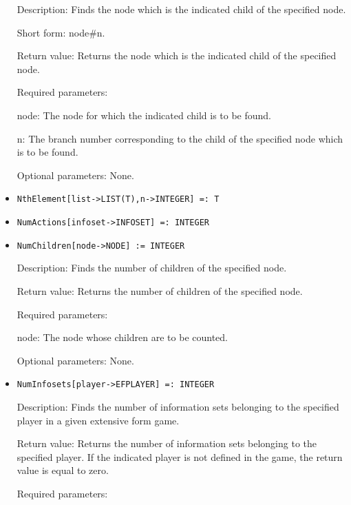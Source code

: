 \begin{itemize}
\bd
\item
[Description:] Finds the node which is the indicated child of the
specified node.  
\item
[Short form:] node\#n.
\item
[Return value:] Returns the node which is the indicated child of the
specified node.
\item
[Required parameters:]\hfil\null
	  
\bd
\item
[node:] The node for which the indicated child is to be found.
\item
[n:] The branch number corresponding to the child of the specified node
which is to be found.
\ed

\item 
[Optional parameters:] None.
\ed

\item
\protect \large \begin{verbatim}
NthElement[list->LIST(T),n->INTEGER] =: T 
\end{verbatim}\normalsize

\item
\protect \large \begin{verbatim}
NumActions[infoset->INFOSET] =: INTEGER
\end{verbatim}\normalsize

\item
\protect \large \begin{verbatim}
NumChildren[node->NODE] := INTEGER
\end{verbatim}\normalsize

\bd
\item
[Description:] Finds the number of children of the specified node.
\item
[Return value:] Returns the number of children of the specified node.
\item
[Required parameters:]\hfil\null

\bd
\item
[node:] The node whose children are to be counted.
\ed

\item
[Optional parameters:] None.
\ed

\item
\protect \large \begin{verbatim}
NumInfosets[player->EFPLAYER] =: INTEGER
\end{verbatim}\normalsize

\bd
\item
[Description:] Finds the number of information sets belonging to the
specified player in a given extensive form game.
\item
[Return value:] Returns the number of information sets belonging to
the specified player.  If the indicated player is not defined in the
game, the return value is equal to zero.
\item
[Required parameters:]\hfil\null


\end{itemize}
